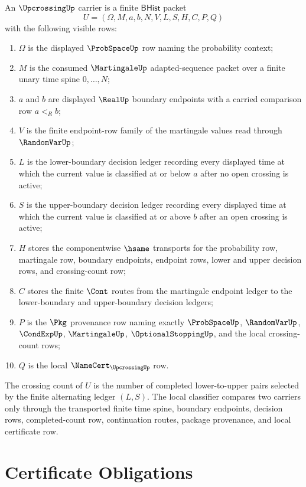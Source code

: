 \begin{definition}
\label{def:upcrossing-carrier}
An $\UpcrossingUp$ carrier is a finite $\mathsf{BHist}$ packet
$$
U=(\Omega,M,a,b,N,V,L,S,H,C,P,Q)
$$
with the following visible rows:
\begin{enumerate}
\item $\Omega$ is the displayed $\ProbSpaceUp$ row naming the probability context;
\item $M$ is the consumed $\MartingaleUp$ adapted-sequence packet over a finite unary time spine $0,\ldots,N$;
\item $a$ and $b$ are displayed $\RealUp$ boundary endpoints with a carried comparison row $a<_R b$;
\item $V$ is the finite endpoint-row family of the martingale values read through $\RandomVarUp$;
\item $L$ is the lower-boundary decision ledger recording every displayed time at which the current value is classified at or below $a$ after no open crossing is active;
\item $S$ is the upper-boundary decision ledger recording every displayed time at which the current value is classified at or above $b$ after an open crossing is active;
\item $H$ stores the componentwise $\hsame$ transports for the probability row, martingale row, boundary endpoints, endpoint rows, lower and upper decision rows, and crossing-count row;
\item $C$ stores the finite $\Cont$ routes from the martingale endpoint ledger to the lower-boundary and upper-boundary decision ledgers;
\item $P$ is the $\Pkg$ provenance row naming exactly $\ProbSpaceUp$, $\RandomVarUp$, $\CondExpUp$, $\MartingaleUp$, $\OptionalStoppingUp$, and the local crossing-count rows;
\item $Q$ is the local $\NameCert_{\UpcrossingUp}$ row.
\end{enumerate}
The crossing count of $U$ is the number of completed lower-to-upper pairs selected by the finite alternating ledger $(L,S)$. The local classifier compares two carriers only through the transported finite time spine, boundary endpoints, decision rows, completed-count row, continuation routes, package provenance, and local certificate row.
\end{definition}

\section{Certificate Obligations}
\label{sec:upcrossing-certificate-obligations}

